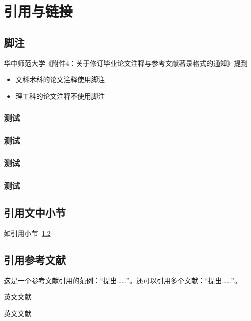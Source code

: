 
\chapter{引用与链接}

\section{脚注}

华中师范大学《附件4：关于修订毕业论文注释与参考文献著录格式的通知》提到

\begin{itemize}
  \item 文科术科的论文注释使用脚注
  \item 理工科的论文注释不使用脚注
\end{itemize}

\subsection{测试}
\subsection{测试}
\subsection{测试}
\subsection{测试}



\section{引用文中小节}\label{sec:ref}

如引用小节~\ref{sec:ref}



\section{引用参考文献}

这是一个参考文献引用的范例：“\parencite{邱泽奇建构与分化}提出……”。还可以引用多个文献：“\parencite{丁文祥rawtype,李晓东rawtype}提出……”。

英文文献 \parencite{feynman2011}

英文文献 \parencite[12]{feynman2011}

